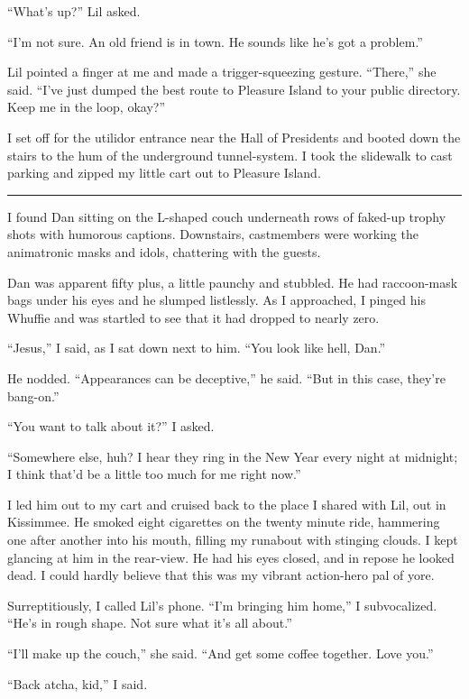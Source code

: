 “What's up?” Lil asked.

“I'm not sure. An old friend is in town. He sounds like he's got a
problem.”

Lil pointed a finger at me and made a trigger-squeezing gesture.
“There,” she said. “I've just dumped the best route to Pleasure
Island to your public directory. Keep me in the loop, okay?”

I set off for the utilidor entrance near the Hall of Presidents and
booted down the stairs to the hum of the underground tunnel-system.
I took the slidewalk to cast parking and zipped my little cart out
to Pleasure Island.

\begin{center}\rule{3in}{0.4pt}\end{center}

I found Dan sitting on the L-shaped couch underneath rows of
faked-up trophy shots with humorous captions. Downstairs,
castmembers were working the animatronic masks and idols,
chattering with the guests.

Dan was apparent fifty plus, a little paunchy and stubbled. He had
raccoon-mask bags under his eyes and he slumped listlessly. As I
approached, I pinged his Whuffie and was startled to see that it
had dropped to nearly zero.

“Jesus,” I said, as I sat down next to him. “You look like hell,
Dan.”

He nodded. “Appearances can be deceptive,” he said. “But in this
case, they're bang-on.”

“You want to talk about it?” I asked.

“Somewhere else, huh? I hear they ring in the New Year every night
at midnight; I think that'd be a little too much for me right
now.”

I led him out to my cart and cruised back to the place I shared
with Lil, out in Kissimmee. He smoked eight cigarettes on the
twenty minute ride, hammering one after another into his mouth,
filling my runabout with stinging clouds. I kept glancing at him in
the rear-view. He had his eyes closed, and in repose he looked
dead. I could hardly believe that this was my vibrant action-hero
pal of yore.

Surreptitiously, I called Lil's phone. “I'm bringing him home,” I
subvocalized. “He's in rough shape. Not sure what it's all about.”

“I'll make up the couch,” she said. “And get some coffee together.
Love you.”

“Back atcha, kid,” I said.

